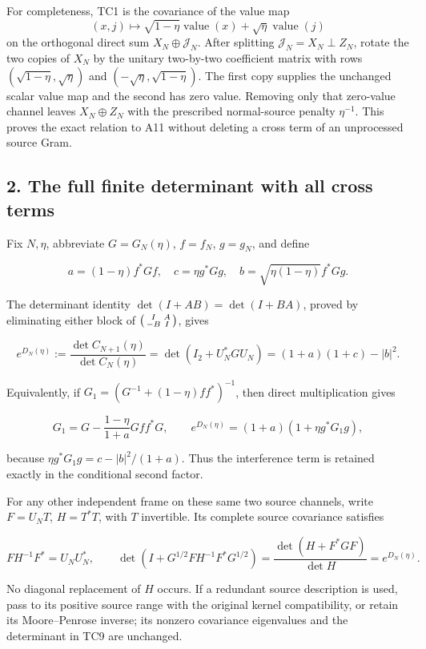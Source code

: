 \documentclass[11pt]{article}
\begin{document}
For completeness, TC1 is the covariance of the value map \[
(x,j)\mapsto\sqrt{1-\eta}\operatorname{value}(x)+\sqrt\eta\operatorname{value}(j)
\] on the orthogonal direct sum \(X_N\oplus\mathcal J_N\). After splitting \(\mathcal J_N=X_N\perp Z_N\), rotate the two copies of \(X_N\) by the unitary two-by-two coefficient matrix with rows \((\sqrt{1-\eta},\sqrt\eta)\) and \((-\sqrt\eta,\sqrt{1-\eta})\). The first copy supplies the unchanged scalar value map and the second has zero value. Removing only that zero-value channel leaves \(X_N\oplus Z_N\) with the prescribed normal-source penalty \(\eta^{-1}\). This proves the exact relation to A11 without deleting a cross term of an unprocessed source Gram.

\subsection{2. The full finite determinant with all cross terms}\label{the-full-finite-determinant-with-all-cross-terms}

Fix \(N,\eta\), abbreviate \(G=G_N(\eta)\), \(f=f_N\), \(g=g_N\), and define

\[
a=(1-\eta)f^*Gf,\quad c=\eta g^*Gg,\quad
b=\sqrt{\eta(1-\eta)}f^*Gg.
\tag{TC6}
\]

The determinant identity \(\det(I+AB)=\det(I+BA)\), proved by eliminating either block of \(\begin{psmallmatrix}I&A\\-B&I\end{psmallmatrix}\), gives

\[
e^{D_N(\eta)}
:=\frac{\det C_{N+1}(\eta)}{\det C_N(\eta)}
=\det(I_2+U_N^*GU_N)
=(1+a)(1+c)-|b|^2.
\tag{TC7}
\]

Equivalently, if \(G_1=(G^{-1}+(1-\eta)ff^*)^{-1}\), then direct multiplication gives

\[
G_1=G-\frac{1-\eta}{1+a}Gff^*G,
\qquad
e^{D_N(\eta)}=(1+a)(1+\eta g^*G_1g),
\tag{TC8}
\]

because \(\eta g^*G_1g=c-|b|^2/(1+a)\). Thus the interference term is retained exactly in the conditional second factor.

For any other independent frame on these same two source channels, write \(F=U_NT\), \(H=T^*T\), with \(T\) invertible. Its complete source covariance satisfies

\[
FH^{-1}F^*=U_NU_N^*,\qquad
\det(I+G^{1/2}FH^{-1}F^*G^{1/2})
=\frac{\det(H+F^*GF)}{\det H}=e^{D_N(\eta)}.
\tag{TC9}
\]

No diagonal replacement of \(H\) occurs. If a redundant source description is used, pass to its positive source range with the original kernel compatibility, or retain its Moore--Penrose inverse; its nonzero covariance eigenvalues and the determinant in TC9 are unchanged.
\end{document}
